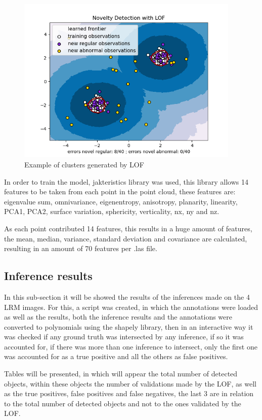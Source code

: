 \begin{figure}[H]
\centering
\includegraphics[height=8cm]{images/lof_example.png}
\caption{Example of clusters generated by LOF}
\end{figure}

In order to train the model, jakteristics library was used, this library allows 14 features to be taken from each point in the point cloud, these features are: eigenvalue sum, omnivariance, eigenentropy, anisotropy, planarity, linearity, PCA1, PCA2, surface variation, sphericity, verticality, nx, ny and nz.

As each point contributed 14 features, this results in a huge amount of features, the mean, median, variance, standard deviation and covariance are calculated, resulting in an amount of 70 features per .las file.

\subsection{Inference results}
In this sub-section it will be showed the results of the inferences made on the 4 LRM images. For this, a script was created, in which the annotations were loaded as well as the results, both the inference results and the annotations were converted to polynomials using the shapely library, then in an interactive way it was checked if any ground truth was intersected by any inference, if so it was accounted for, if there was more than one inference to intersect, only the first one was accounted for as a true positive and all the others as false positives.

Tables will be presented, in which will appear the total number of detected objects, within these objects the number of validations made by the LOF, as well as the true positives, false positives and false negatives, the last 3 are in relation to the total number of detected objects and not to the ones validated by the LOF.

